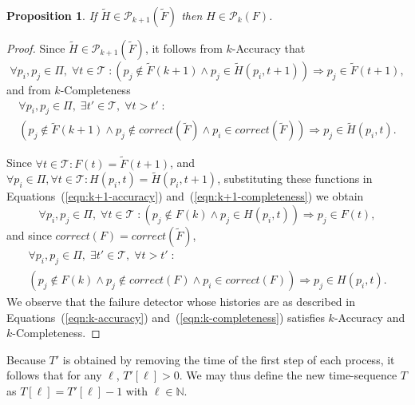 \documentclass[11pt]{article}
\newtheorem{proposition}{Proposition}[section]
\newcommand{\T}{\mathcal{T}}
\newcommand{\Naturals}{\mathbb{N}}
\newcommand{\PFD}{\ensuremath{\mathcal{P}}}
\begin{document}
\begin{proposition}\label{lem:HinDk}
If $\widetilde{H} \in \PFD_{k+1}(\widetilde{F})$  then $H \in \PFD_k(F)$.
\end{proposition} 

\begin{proof} 
Since $\widetilde{H} \in \PFD_{k+1}(\widetilde{F})$, it follows from
$k$-Accuracy that
\begin{equation}\label{eqn:k+1-accuracy}
\forall p_i,p_j \in \Pi,\;
\forall t \in \T\; \colon
 (p_j \notin \widetilde{F}(k+1) \wedge p_j \in 
   \widetilde{H}(p_i, t+1)) \Rightarrow p_j \in \widetilde{F}(t+1),
 \end{equation}
and from $k$-Completeness
\begin{multline}\label{eqn:k+1-completeness}
\forall p_i,p_j \in \Pi,\;
\exists t' \in \T, \;
\forall t>t'\; 
 \colon \\
(p_j \notin \widetilde{F} (k+1) \wedge p_j \notin
 correct(\widetilde{F} ) 
\wedge p_i \in correct (\widetilde{F}) ) \Rightarrow p_j \in \widetilde{H}(p_i, t).
\end{multline}

Since $\forall t \in \T: F(t) = \widetilde{F}(t+1)$, and $\forall p_i
     \in \Pi, \forall t \in \T: H(p_i,t) = \widetilde{H}(p_i,t+1)$,
     substituting these functions in Equations~(\ref{eqn:k+1-accuracy})
     and~(\ref{eqn:k+1-completeness}) we obtain
\begin{equation}\label{eqn:k-accuracy}
\forall p_i,p_j \in \Pi,\;
\forall t \in \T\; :
 (p_j \notin F(k) \wedge p_j \in H(p_i, t)) \Rightarrow p_j \in F(t),
 \end{equation}
and since $correct(F) =
     correct(\widetilde{F})$,
\begin{multline}\label{eqn:k-completeness}
\forall p_i,p_j \in \Pi,\;
\exists t' \in \T, \; 
\forall t>t'\; \colon \\
(p_j \notin F(k) \wedge p_j \notin correct(F) \wedge p_i \in correct
(F))
 \Rightarrow p_j \in H(p_i, t).
\end{multline}
We observe that the failure detector whose histories are as described in
Equations~(\ref{eqn:k-accuracy}) and~(\ref{eqn:k-completeness}) 
     satisfies $k$-Accuracy and $k$-Completeness.
\end{proof}


Because $T'$ is obtained by removing the time of the first step of each
     process, it follows that for any $\ell$, $T'[\ell]>0$.
We may thus define the new time-sequence $T$ as $T[\ell] = T'[\ell]-1$
     with $\ell\in\Naturals$.
\end{document}
